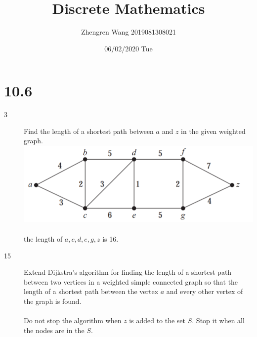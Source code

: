 \documentclass[UTF8]{article}
\title{Discrete Mathematics}
\author{Zhengren Wang 2019081308021}
\date{06/02/2020 Tue}
\begin{document}
\maketitle 

\part{10.6}
\begin{description}
    \item[3]Find the length of a shortest path between $a$ and $z$ in the given weighted graph. \\
        \includegraphics[scale=0.3]{../imgs/10_6_3.png}\\\\
        the length of $a,c,d,e,g,z$ is 16.

    \item[15]Extend Dijkstra’s algorithm for finding the length of a shortest path between two vertices in a weighted simple connected graph so that the length of a shortest path between the vertex $a$ and every other vertex of the graph is found. \\\\
        Do not stop the algorithm when $z$ is added to the set $S$. Stop it when all the nodes are in the $S$.

\end{description}
\end{document}
